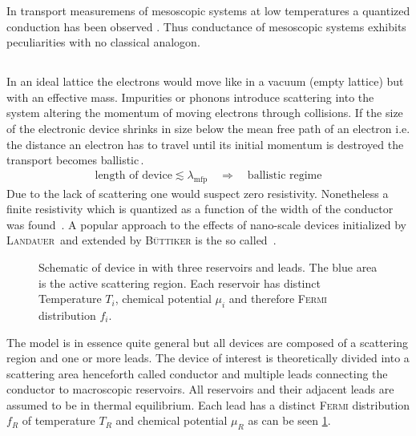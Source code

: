 In transport measuremens of mesoscopic systems at low temperatures a quantized conduction has been observed \cite{PhysRevLett.45.494}. Thus conductance of mesoscopic systems exhibits peculiarities with no classical analogon.
\subsection{\clanbform{}}\label{sec:landauerbuettiker}
In an ideal lattice the electrons would move like in a vacuum (empty lattice) but with an effective mass. Impurities or phonons introduce scattering into the system altering the momentum of moving electrons through collisions.
If the size of the electronic device shrinks in size below the mean free path of an electron i.e. the distance an electron has to travel until its initial momentum is destroyed the transport becomes ballistic\,\cite{datta1989quantum}. 
\begin{align}
	\text{length of device} \lesssim \lambda_{\text{mfp}}\quad \Rightarrow \quad\text{ballistic regime}
	\label{eqn:meanfreepath}
\end{align}
Due to the lack of scattering one would suspect zero resistivity. Nonetheless a finite resistivity which is quantized as a function of the width of the conductor was found \,\cite{PhysRevLett.60.848}.
A popular approach to the effects of nano-scale devices initialized by \textsc{Landauer}\,\cite{PhilMag.21.863} and extended by \textsc{B\"uttiker} is the so called \lanbform{}\,\cite{PhysRevB.31.6207}.  
\begin{figure}[h]
\centering
{}
\caption{Schematic of device in \lanbform{} with three reservoirs and leads. The blue area is the active scattering region. Each reservoir has distinct Temperature $T_i$, chemical potential $\mu_i$ and therefore \textsc{Fermi} distribution $f_i$.}
\label{fig:lanbform}
\end{figure}
The  model is in essence quite general but all devices are composed of a scattering region and one or more leads. The device of interest is theoretically divided into a scattering area henceforth called conductor and multiple leads connecting the conductor to macroscopic reservoirs. All reservoirs and their adjacent leads are assumed to be in thermal equilibrium. Each lead has a distinct \textsc{Fermi} distribution $f_R$ of temperature $T_R$ and chemical potential $\mu_R$ as can be seen \cref{fig:lanbform}.
